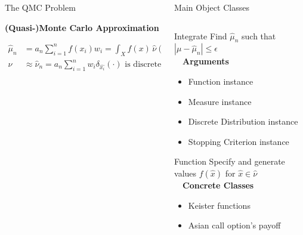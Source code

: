 \documentclass[final]{beamer}
\newcommand{\bfCenter}[1]{\centerline{\textbf{#1}}}
\newlength{\onecolwid}
\newlength{\twocolwid}
\newlength{\threecolwid}
\newcommand{\dif}{\mathrm{d}}
\begin{document}
\begin{frame}[t]
\begin{columns}[t]
\begin{column}{\threecolwid}
\begin{columns}[t,totalwidth=\threecolwid]
\begin{column}{\onecolwid}
\begin{block}{The QMC Problem}
    \vspace{2ex}
    \bfCenter{(Quasi-)Monte Carlo Approximation}
        \begin{align*}
            \hat{\mu}_n &= a_n \sum_{i=1}^{n} f(x_i)w_i =  \int_{X} f(x) \, \hat{\nu}( \dif x)
            \label{qmcApprox}
	\\ \nu & \approx \hat{\nu}_n = a_n \sum_{i=1}^n w_i \delta_{\hat{x_i}}(\cdot) 
            \text{ is discrete probability measure}
        \end{align*}
\end{block}
\end{column}


\begin{column}{\twocolwid}\vspace{-1in}
\begin{block}{Main Object Classes}
\begin{column}{\onecolwid}
\begin{alertblock}{Integrate}
    Find $\hat{\mu}_n$ such that $\left | \mu - \hat{\mu}_n \right  | \leq \epsilon$ \\[1ex]~\
    \textbf{Arguments}
    \begin{itemize}
        \item Function instance
        \item Measure instance
        \item Discrete Distribution instance
        \item Stopping Criterion instance
    \end{itemize}
\end{alertblock}

\begin{alertblock}{Function}
    Specify and generate values $f(\hat{x})$ for $\hat{x} \in \hat{\nu}$ \\[1ex]~\
    \textbf{Concrete Classes}
    \begin{itemize}
        \item Keister functions \cite{keister1996multidimensional}
        \item Asian call option's payoff 
    \end{itemize}
\end{alertblock}


\end{column}
\end{block}
\end{column}
\end{columns}
\end{column}
\end{columns}
\end{frame}
\end{document}
